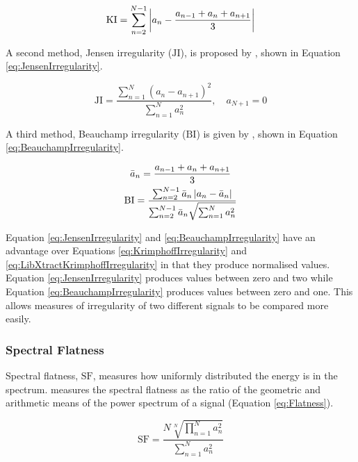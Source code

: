 			\begin{equation}
				\mathrm{KI} = \sum_{n = 2}^{N - 1}
						  \left|a_{n} - \frac{a_{n-1} + a_{n} + a_{n+1}}{3}\right|
				\label{eq:LibXtractKrimphoffIrregularity}
			\end{equation}

			A second method, Jensen irregularity ($\mathrm{JI}$), is proposed by \citet{jensen1999timbre},
			shown in Equation \ref{eq:JensenIrregularity}.

			\begin{equation}
				\mathrm{JI} = \frac{\sum_{n = 1}^{N} (a_{n} - a_{n+1})^{2}}
						   {\sum_{n = 1}^{N} a_{n}^{2}},
					      \quad a_{N+1} = 0
				\label{eq:JensenIrregularity}
			\end{equation}

			A third method, Beauchamp irregularity ($\mathrm{BI}$) is given by \citet{beauchamp2007analysis},
			shown in Equation \ref{eq:BeauchampIrregularity}.

			\begin{gather}
			        \bar{a}_{n} = \frac{a_{n-1} + a_{n} + a_{n+1}}{3} \nonumber \\
				\mathrm{BI} = \frac{\sum_{n = 2}^{N - 1} \bar{a}_{n} \left|a_{n} - \bar{a}_{n}\right|}
						   {\sum_{n = 2}^{N - 1} \bar{a}_{n} \sqrt{\sum_{n = 1}^{N} a_{n}^{2}}}
				\label{eq:BeauchampIrregularity}
			\end{gather}

			Equation \ref{eq:JensenIrregularity} and \ref{eq:BeauchampIrregularity} have an advantage over
			Equations \ref{eq:KrimphoffIrregularity} and \ref{eq:LibXtractKrimphoffIrregularity} in that they
			produce normalised values. Equation \ref{eq:JensenIrregularity} produces values between zero and
			two while Equation \ref{eq:BeauchampIrregularity} produces values between zero and one. This allows
			measures of irregularity of two different signals to be compared more easily.

		\subsubsection*{Spectral Flatness}
			Spectral flatness, $\mathrm{SF}$, measures how uniformly distributed the energy is in the spectrum.
			\citet{johnston1988transform} measures the spectral flatness as the ratio of the geometric and
			arithmetic means of the power spectrum of a signal (Equation \ref{eq:Flatness}).

			\begin{equation}
				\mathrm{SF} = \frac{N\sqrt[N]{\prod_{n = 1}^{N} a_{n}^{2}}}
						   {\sum_{n = 1}^{N} a_{n}^{2}}
				\label{eq:Flatness}
			\end{equation}

